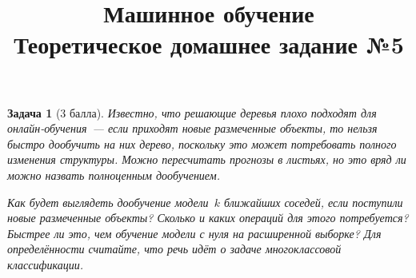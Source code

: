\documentclass[12pt,fleqn]{article}
\newtheorem{esProblem}{Задача}
\begin{document}
\title{Машинное обучение\\Теоретическое домашнее задание №5}
\date{}
\author{}
\maketitle


\begin{esProblem}[3 балла]
    Известно, что решающие деревья плохо подходят для онлайн-обучения~---
    если приходят новые размеченные объекты, то нельзя быстро дообучить на них дерево,
    поскольку это может потребовать полного изменения структуры.
    Можно пересчитать прогнозы в листьях, но это вряд ли можно назвать полноценным дообучением.

    Как будет выглядеть дообучение модели~$k$ ближайших соседей,
    если поступили новые размеченные объекты?
    Сколько и каких операций для этого потребуется?
    Быстрее ли это, чем обучение модели с нуля на расширенной выборке?
    Для определённости считайте, что речь идёт о задаче многоклассовой классификации.
\end{esProblem}
\end{document}

